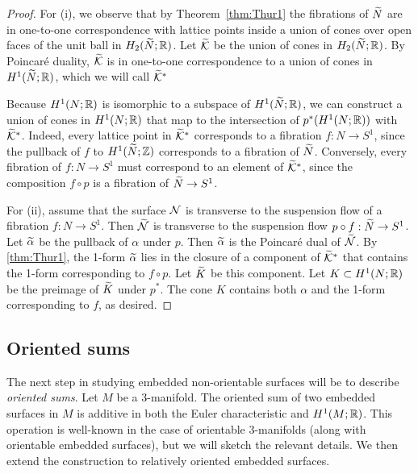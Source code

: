 \begin{proof}
For (i), we observe that by Theorem~\ref{thm:Thur1} the fibrations of $\widetilde{N}$ are in one-to-one correspondence with lattice points inside a union of cones over open faces of the unit ball in $H_2(\widetilde{N};\mathbb{R})$.  Let $\widetilde{\mathcal{K}}$ be the union of cones in $H_2(\widetilde{N};\mathbb{R})$.
 By Poincar\'e duality, $\widetilde{\mathcal{K}}$ is in one-to-one correspondence to a union of cones in $H^1(\widetilde{N};\mathbb{R})$, which we will call $\widetilde{\mathcal{K}}^\ast$

  Because $H^1(N;\mathbb{R})$ is isomorphic to a subspace of $H^1(\widetilde{N};\mathbb{R})$, we can construct a union of cones in $H^1(N; \mathbb{R})$ that map to the intersection of $p^\ast(H^1(N; \mathbb{R}))$ with $\widetilde{\mathcal{K}}^\ast$.
  Indeed, every lattice point in $\widetilde{\mathcal{K}}^\ast$ corresponds to a fibration $f:N\to S^1$, since the pullback of $f$ to $H^1(\widetilde{N}; \mathbb{Z})$ corresponds to a fibration of $\widetilde{N}$.
  Conversely, every fibration of $f:N\rightarrow S^1$ must correspond to an element of $\widetilde{\mathcal{K}}^\ast$, since the composition $f\circ p$ is a fibration of $\widetilde{N}\rightarrow S^1$.

  For (ii), assume that the surface $\mathcal{N}$ is transverse to the suspension flow of a fibration $f:N\rightarrow S^1$. Then $\widetilde{\mathcal{N}}$ is transverse to the suspension flow $p \circ f:\widetilde{N}\rightarrow S^1$.  Let $\widetilde{\alpha}$ be the pullback of $\alpha$ under $p$.  Then $\widetilde{\alpha}$ is the Poincar\'e dual of $\widetilde{\mathcal{N}}$.  By \autoref{thm:Thur1}, the 1-form $\widetilde{\alpha}$ lies in the closure of a component of $\widetilde{\mathcal{K}}^\ast$ that contains the 1-form corresponding to $f\circ p$.  Let $\widetilde{K}$ be this component.  Let $K\subset H^1(N;\mathbb{R})$ be the preimage of $\widetilde{K}$ under $p^\ast$.  The cone $K$ contains both $\alpha$ and the 1-form corresponding to $f$, as desired.
\end{proof}

\subsection{Oriented sums}
\label{sec:oriented-sums}

The next step in studying embedded non-orientable surfaces will be to describe \emph{oriented sums}.  Let $M$ be a 3-manifold.
The oriented sum of two embedded surfaces in $M$ is additive in both the Euler characteristic and $H^1(M;\mathbb{R})$.
This operation is well-known in the case of orientable $3$-manifolds (along with orientable embedded surfaces), but we will sketch the relevant details.
We then extend the construction to relatively oriented embedded surfaces.

